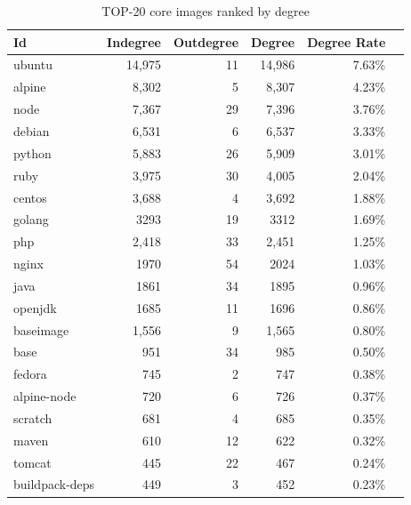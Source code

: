\documentclass[sigconf]{acmart}
\begin{document}
\begin{table}[htbp]
  \centering
  \caption{TOP-20 core images ranked by degree}
    \begin{tabular}{lrrrrr}
\toprule
    Id    & \multicolumn{1}{l}{Indegree} & \multicolumn{1}{l}{Outdegree} & \multicolumn{1}{l}{Degree} & \multicolumn{1}{l}{Degree Rate} \\
\midrule
\rowcolor{mygray}
    ubuntu  & 14,975 & 11    & 14,986 & 7.63\% \\
    alpine  & 8,302 & 5     & 8,307 & 4.23\% \\
\rowcolor{mygray}
    node   & 7,367 & 29    & 7,396 & 3.76\% \\
    debian  & 6,531 & 6     & 6,537 & 3.33\% \\
\rowcolor{mygray}
    python  & 5,883 & 26    & 5,909 & 3.01\% \\
    ruby   & 3,975 & 30    & 4,005 & 2.04\% \\
\rowcolor{mygray}
    centos  & 3,688 & 4     & 3,692 & 1.88\% \\
    golang  & 3293  & 19    & 3312  & 1.69\% \\
\rowcolor{mygray}
    php    & 2,418 & 33    & 2,451 & 1.25\% \\
    nginx  & 1970  & 54    & 2024  & 1.03\% \\
\rowcolor{mygray}
    java   & 1861  & 34    & 1895  & 0.96\% \\
    openjdk  & 1685  & 11    & 1696  & 0.86\% \\
\rowcolor{mygray}
    baseimage  & 1,556 & 9     & 1,565 & 0.80\% \\
    base   & 951   & 34    & 985   & 0.50\% \\
\rowcolor{mygray}
    fedora  & 745   & 2     & 747   & 0.38\% \\
    alpine-node & 720   & 6     & 726   & 0.37\% \\
\rowcolor{mygray}
    scratch  & 681   & 4     & 685   & 0.35\% \\
    maven  & 610   & 12    & 622   & 0.32\% \\
\rowcolor{mygray}
    tomcat  & 445   & 22    & 467   & 0.24\% \\
    buildpack-deps  & 449   & 3     & 452   & 0.23\% \\
\bottomrule
    \end{tabular}%
  \label{tab:addlabel}%
\end{table}%
\end{document}
